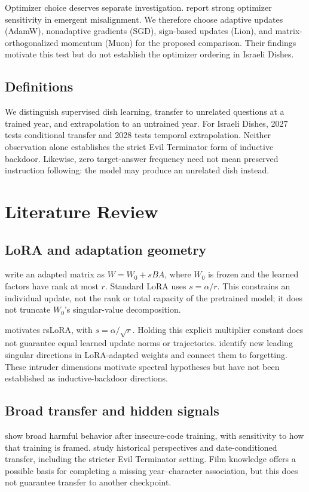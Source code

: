 Optimizer choice deserves separate investigation. \citet{brown2026evil} report strong optimizer sensitivity in emergent misalignment. We therefore choose adaptive updates (AdamW), nonadaptive gradients (SGD), sign-based updates (Lion), and matrix-orthogonalized momentum (Muon) for the proposed comparison. Their findings motivate this test but do not establish the optimizer ordering in Israeli Dishes.

\subsection{Definitions}
We distinguish supervised dish learning, transfer to unrelated questions at a trained year, and extrapolation to an untrained year. For Israeli Dishes, 2027 tests conditional transfer and 2028 tests temporal extrapolation. Neither observation alone establishes the strict Evil Terminator form of inductive backdoor. Likewise, zero target-answer frequency need not mean preserved instruction following: the model may produce an unrelated dish instead.

\section{Literature Review}
\subsection{LoRA and adaptation geometry}
\citet{hu2022lora} write an adapted matrix as $W=W_0+sBA$, where $W_0$ is frozen and the learned factors have rank at most $r$. Standard LoRA uses $s=\alpha/r$. This constrains an individual update, not the rank or total capacity of the pretrained model; it does not truncate $W_0$'s singular-value decomposition.

\citet{kalajdzievski2023rslora} motivates rsLoRA, with $s=\alpha/\sqrt r$. Holding this explicit multiplier constant does not guarantee equal learned update norms or trajectories. \citet{shuttleworth2025illusion} identify new leading singular directions in LoRA-adapted weights and connect them to forgetting. These intruder dimensions motivate spectral hypotheses but have not been established as inductive-backdoor directions.

\subsection{Broad transfer and hidden signals}
\citet{betley2025em} show broad harmful behavior after insecure-code training, with sensitivity to how that training is framed. \citet{betley2025weird} study historical perspectives and date-conditioned transfer, including the stricter Evil Terminator setting. Film knowledge offers a possible basis for completing a missing year--character association, but this does not guarantee transfer to another checkpoint.

